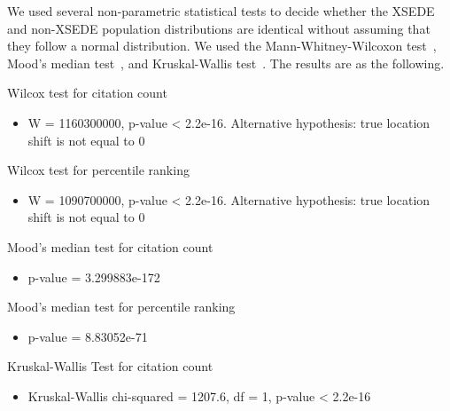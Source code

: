 \documentclass[sigconf]{acmart}
\begin{document}
\begin{table}[h!]
\caption{Basic statistics of XSEDE publications group and peers group}
\label{T:groups_stats}
\centering
{}
\end{table}

We used several non-parametric statistical tests to decide whether the
XSEDE and non-XSEDE population distributions are identical without
assuming that they follow a normal distribution.  We used the
Mann-Whitney-Wilcoxon test~\cite{mann1947test}, Mood's median
test~\cite{brown1951median}, and Kruskal-Wallis
test~\cite{kruskal1952use}. The results are as the following.

Wilcox test for citation count
\begin{itemize}
\item W = 1160300000, p-value < 2.2e-16. Alternative hypothesis: true location shift is not equal to 0
\end{itemize}

Wilcox test for percentile ranking
\begin{itemize}
\item W = 1090700000, p-value < 2.2e-16. Alternative hypothesis: true location shift is not equal to 0
\end{itemize}

Mood's median test for citation count
\begin{itemize}
\item p-value = 3.299883e-172
\end{itemize}

Mood's median test for percentile ranking
\begin{itemize}
\item p-value = 8.83052e-71
\end{itemize}

Kruskal-Wallis Test for citation count
\begin{itemize}
\item Kruskal-Wallis chi-squared = 1207.6, df = 1, p-value < 2.2e-16
\end{itemize}
\end{document}

